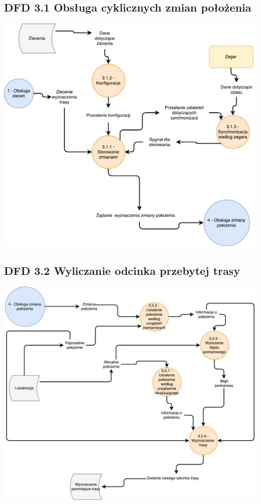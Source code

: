 \documentclass[11pt]{article}
\begin{document}
	\subsection{DFD 3.1 Obsługa cyklicznych zmian położenia}
	\begin{center}
		\includegraphics[scale=0.65]{DFD31.pdf}
	\end{center}
	\newpage
	\subsection{DFD 3.2 Wyliczanie odcinka przebytej trasy}
	\begin{center}
		\includegraphics[scale=0.65]{DFD32.pdf}
	\end{center}
\end{document}
